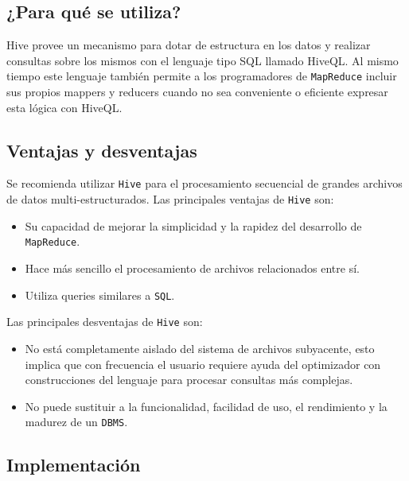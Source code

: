 \documentclass[]{article}
\begin{document}
\subsection{¿Para qué se utiliza?}\label{para-que-se-utiliza-4}

Hive provee un mecanismo para dotar de estructura en los datos y
realizar consultas sobre los mismos con el lenguaje tipo SQL llamado
HiveQL. Al mismo tiempo este lenguaje también permite a los
programadores de \texttt{MapReduce} incluir sus propios mappers y
reducers cuando no sea conveniente o eficiente expresar esta lógica con
HiveQL.

\subsection{Ventajas y desventajas}\label{ventajas-y-desventajas-4}

Se recomienda utilizar \texttt{Hive} para el procesamiento secuencial de
grandes archivos de datos multi-estructurados. Las principales ventajas
de \texttt{Hive} son:

\begin{itemize}
\itemsep1pt\parskip0pt
\item
  Su capacidad de mejorar la simplicidad y la rapidez del desarrollo de
  \texttt{MapReduce}.
\item
  Hace más sencillo el procesamiento de archivos relacionados entre sí.
\item
  Utiliza queries similares a \texttt{SQL}.
\end{itemize}

Las principales desventajas de \texttt{Hive} son:

\begin{itemize}
\itemsep1pt\parskip0pt
\item
  No está completamente aislado del sistema de archivos subyacente, esto
  implica que con frecuencia el usuario requiere ayuda del optimizador
  con construcciones del lenguaje para procesar consultas más complejas.
\item
  No puede sustituir a la funcionalidad, facilidad de uso, el
  rendimiento y la madurez de un \texttt{DBMS}.
\end{itemize}

\subsection{Implementación}\label{implementacion-5}
\end{document}
